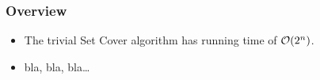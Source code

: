 \begin{frame}\frametitle{Overview}
\begin{itemize}
\pause \item The trivial Set Cover algorithm has running time of ${\cal O}(2^n)$.
\pause \item bla, bla, bla\ldots
\end{itemize}

\end{frame}